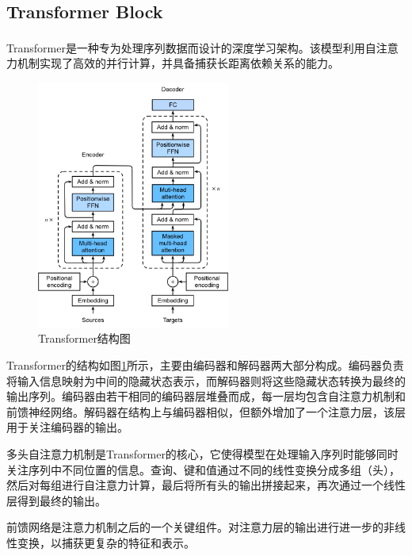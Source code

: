 \documentclass[journal]{IEEEtran}
\numberwithin{figure}{section}%
\begin{document}
\subsection{Transformer Block}
Transformer\textsuperscript{\cite{2}}是一种专为处理序列数据而设计的深度学习架构。该模型利用自注意力机制实现了高效的并行计算，并具备捕获长距离依赖关系的能力。\par

\begin{figure}
  \centering
  \includegraphics[width=2.5in]{./figures/4_3.png}
  \caption{Transformer结构图}
  \label{fig:Transformer}
\end{figure}

Transformer的结构如图\ref{fig:Transformer}所示，主要由编码器和解码器两大部分构成。编码器负责将输入信息映射为中间的隐藏状态表示，而解码器则将这些隐藏状态转换为最终的输出序列。编码器由若干相同的编码器层堆叠而成，每一层均包含自注意力机制和前馈神经网络。解码器在结构上与编码器相似，但额外增加了一个注意力层，该层用于关注编码器的输出。\par

多头自注意力机制是Transformer的核心，它使得模型在处理输入序列时能够同时关注序列中不同位置的信息。查询、键和值通过不同的线性变换分成多组（头），然后对每组进行自注意力计算，最后将所有头的输出拼接起来，再次通过一个线性层得到最终的输出。\par

前馈网络是注意力机制之后的一个关键组件。对注意力层的输出进行进一步的非线性变换，以捕获更复杂的特征和表示。\par
\end{document}
